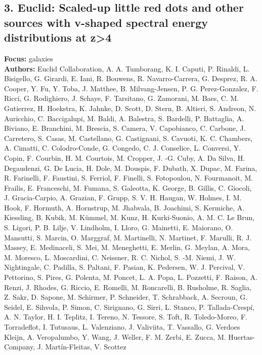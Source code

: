 \documentclass[11pt]{article}
\begin{document}
\subsection*{3. Euclid: Scaled-up little red dots and other sources with v-shaped spectral energy distributions at z>4}
\textbf{Focus:} galaxies\\
\textbf{Authors:} Euclid Collaboration, A. A. Tumborang, K. I. Caputi, P. Rinaldi, L. Bisigello, G. Girardi, E. Iani, R. Bouwens, R. Navarro-Carrera, G. Desprez, R. A. Cooper, Y. Fu, Y. Toba, J. Matthee, B. Milvang-Jensen, P. G. Perez-Gonzalez, F. Ricci, G. Rodighiero, J. Schaye, F. Tarsitano, G. Zamorani, M. Baes, C. M. Gutierrez, H. Hoekstra, K. Jahnke, D. Scott, D. Stern, B. Altieri, S. Andreon, N. Auricchio, C. Baccigalupi, M. Baldi, A. Balestra, S. Bardelli, P. Battaglia, A. Biviano, E. Branchini, M. Brescia, S. Camera, V. Capobianco, C. Carbone, J. Carretero, S. Casas, M. Castellano, G. Castignani, S. Cavuoti, K. C. Chambers, A. Cimatti, C. Colodro-Conde, G. Congedo, C. J. Conselice, L. Conversi, Y. Copin, F. Courbin, H. M. Courtois, M. Cropper, J. -G. Cuby, A. Da Silva, H. Degaudenzi, G. De Lucia, H. Dole, M. Douspis, F. Dubath, X. Dupac, M. Farina, R. Farinelli, F. Faustini, S. Ferriol, F. Finelli, S. Fotopoulou, N. Fourmanoit, M. Frailis, E. Franceschi, M. Fumana, S. Galeotta, K. George, B. Gillis, C. Giocoli, J. Gracia-Carpio, A. Grazian, F. Grupp, S. V. H. Haugan, W. Holmes, I. M. Hook, F. Hormuth, A. Hornstrup, M. Jhabvala, B. Joachimi, S. Kermiche, A. Kiessling, B. Kubik, M. Kümmel, M. Kunz, H. Kurki-Suonio, A. M. C. Le Brun, S. Ligori, P. B. Lilje, V. Lindholm, I. Lloro, G. Mainetti, E. Maiorano, O. Mansutti, S. Marcin, O. Marggraf, M. Martinelli, N. Martinet, F. Marulli, R. J. Massey, E. Medinaceli, S. Mei, M. Meneghetti, E. Merlin, G. Meylan, A. Mora, M. Moresco, L. Moscardini, C. Neissner, R. C. Nichol, S. -M. Niemi, J. W. Nightingale, C. Padilla, S. Paltani, F. Pasian, K. Pedersen, W. J. Percival, V. Pettorino, S. Pires, G. Polenta, M. Poncet, L. A. Popa, L. Pozzetti, F. Raison, A. Renzi, J. Rhodes, G. Riccio, E. Romelli, M. Roncarelli, B. Rusholme, R. Saglia, Z. Sakr, D. Sapone, M. Schirmer, P. Schneider, T. Schrabback, A. Secroun, G. Seidel, E. Sihvola, P. Simon, C. Sirignano, G. Sirri, L. Stanco, P. Tallada-Crespí, A. N. Taylor, H. I. Teplitz, I. Tereno, N. Tessore, S. Toft, R. Toledo-Moreo, F. Torradeflot, I. Tutusaus, L. Valenziano, J. Valiviita, T. Vassallo, G. Verdoes Kleijn, A. Veropalumbo, Y. Wang, J. Weller, F. M. Zerbi, E. Zucca, M. Huertas-Company, J. Martín-Fleitas, V. Scottez\\
\end{document}
